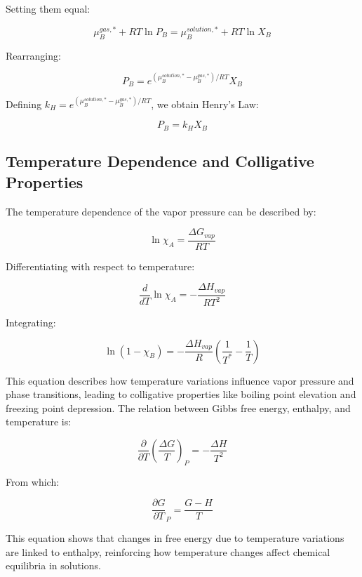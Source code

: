 \documentclass{article}
\theoremstyle{definition}
\begin{document}
Setting them equal:

\begin{equation}
\mu_B^{gas,*} + RT \ln P_B = \mu_B^{solution,*} + RT \ln X_B
\end{equation}

Rearranging:

\begin{equation}
P_B = e^{(\mu_B^{solution,*} - \mu_B^{gas,*}) / RT} X_B
\end{equation}

Defining $k_H = e^{(\mu_B^{solution,*} - \mu_B^{gas,*}) / RT}$, we obtain Henry’s Law:

\begin{equation}
P_B = k_H X_B
\end{equation}

\subsection{Temperature Dependence and Colligative Properties}

The temperature dependence of the vapor pressure can be described by:

\begin{equation}
\ln{\chi_A} = \frac{\Delta G_{vap}}{RT}
\end{equation}

Differentiating with respect to temperature:

\begin{equation}
\frac{d}{dT} \ln{\chi_A} = - \frac{\Delta H_{vap}}{RT^2}
\end{equation}

Integrating:

\begin{equation}
\ln(1 - \chi_B) = -\frac{\Delta H_{vap}}{R} \left( \frac{1}{T^*} - \frac{1}{T} \right)
\end{equation}

This equation describes how temperature variations influence vapor pressure and phase transitions, leading to colligative properties like boiling point elevation and freezing point depression. The relation between Gibbs free energy, enthalpy, and temperature is:

\begin{equation}
\frac{\partial}{\partial T} \left( \frac{\Delta G}{T} \right)_P = - \frac{\Delta H}{T^2}
\end{equation}

From which:

\begin{equation}
\frac{\partial G}{\partial T}_P = \frac{G - H}{T}
\end{equation}

This equation shows that changes in free energy due to temperature variations are linked to enthalpy, reinforcing how temperature changes affect chemical equilibria in solutions.
\end{document}
